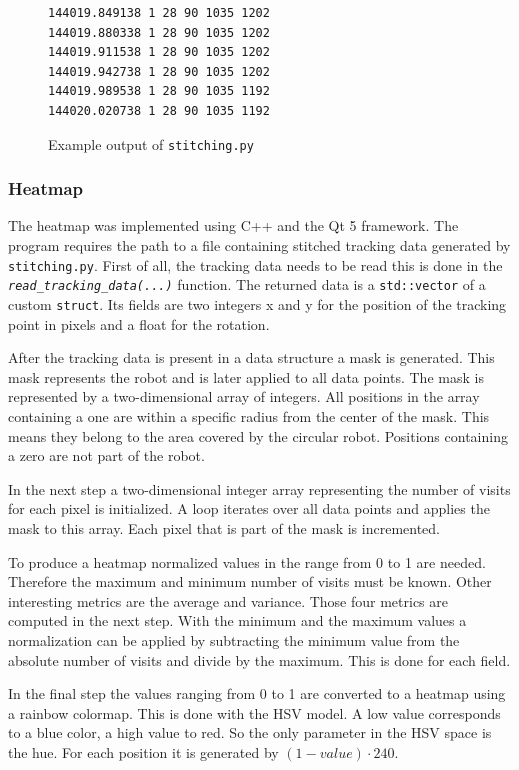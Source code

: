 \documentclass[twoside]{article}
\begin{document}
\begin{figure}
\begin{verbatim}
144019.849138 1 28 90 1035 1202
144019.880338 1 28 90 1035 1202
144019.911538 1 28 90 1035 1202
144019.942738 1 28 90 1035 1202
144019.989538 1 28 90 1035 1192
144020.020738 1 28 90 1035 1192
\end{verbatim}
\caption{Example output of \texttt{stitching.py}}
\end{figure}

\subsubsection{Heatmap}
The heatmap was implemented using C++ and the Qt 5 framework. The program requires the path to a file containing stitched tracking data generated by \texttt{stitching.py}. First of all, the tracking data needs to be read this is done in the \textit{\texttt{read\_tracking\_data(...)}} function. The returned data is a \texttt{std::vector} of a custom \texttt{struct}. Its fields are two integers x and y for the position of the tracking point in pixels and a float for the rotation.

After the tracking data is present in a data structure a mask is generated. This mask represents the robot and is later applied to all data points. The mask is represented by a two-dimensional array of integers. All positions in the array containing a one are within a specific radius from the center of the mask. This means they belong to the area covered by the circular robot. Positions containing a zero are not part of the robot.

In the next step a two-dimensional integer array representing the number of visits for each pixel is initialized. A loop iterates over all data points and applies the mask to this array. Each pixel that is part of the mask is incremented.

To produce a heatmap normalized values in the range from 0 to 1 are needed. Therefore the maximum and minimum number of visits must be known. Other interesting metrics are the average and variance. Those four metrics are computed in the next step. With the minimum and the maximum values a normalization can be applied by subtracting the minimum value from the absolute number of visits and divide by the maximum. This is done for each field.

In the final step the values ranging from 0 to 1 are converted to a heatmap using a rainbow colormap. This is done with the HSV model. A low value corresponds to a blue color, a high value to red. So the only parameter in the HSV space is the hue. For each position it is generated by $(1 - value) \cdot 240$.
\end{document}
